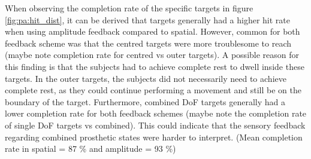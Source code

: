 When observing the completion rate of the specific targets in figure \ref{fig:pa:hit_dist}, it can be derived that targets generally had a higher hit rate when using amplitude feedback compared to spatial. However, common for both feedback scheme was that the centred targets were more troublesome to reach (maybe note completion rate for centred vs outer targets). A possible reason for this finding is that the subjects had to achieve complete rest to dwell inside these targets. In the outer targets, the subjects did not necessarily need to achieve complete rest, as they could continue performing a movement and still be on the boundary of the target. Furthermore, combined DoF targets generally had a lower completion rate for both feedback schemes (maybe note the completion rate of single DoF targets vs combined). This could indicate that the sensory feedback regarding combined prosthetic states were harder to interpret. (Mean completion rate in spatial = 87 \% and amplitude = 93 \%)


